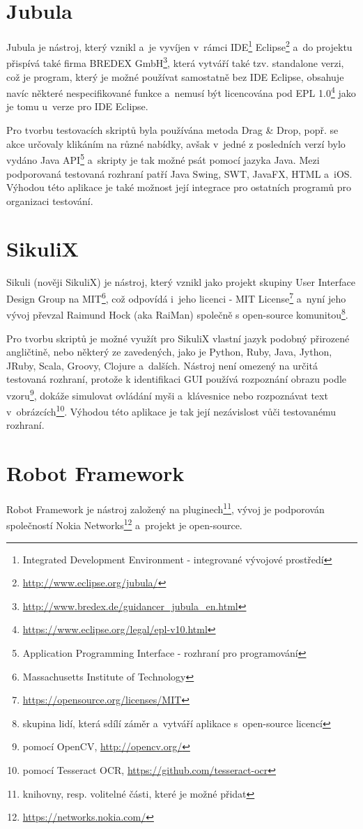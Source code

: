\documentclass{bakalarka}
\begin{document}
	\section{Jubula}
	Jubula je nástroj, který vznikl a~je vyvíjen v~rámci IDE\footnote{Integrated Development Environment - integrované vývojové prostředí} Eclipse\footnote{\url{http://www.eclipse.org/jubula/}} a~do projektu přispívá také firma BREDEX GmbH\footnote{\url{http://www.bredex.de/guidancer_jubula_en.html}}, která vytváří také tzv. standalone verzi, což je program, který je možné používat samostatně bez IDE Eclipse, obsahuje navíc některé nespecifikované funkce a~nemusí být licencována pod EPL 1.0\footnote{\url{https://www.eclipse.org/legal/epl-v10.html}} jako je tomu u~verze pro IDE Eclipse.
	
	Pro tvorbu testovacích skriptů byla používána metoda Drag \& Drop, popř. se akce určovaly klikáním na různé nabídky, avšak v~jedné z posledních verzí bylo vydáno Java API\footnote{Application Programming Interface - rozhraní pro programování} a~skripty je tak možné psát pomocí jazyka Java. Mezi podporovaná testovaná rozhraní patří Java Swing, SWT, JavaFX, HTML a~iOS. Výhodou této aplikace je také možnost její integrace pro ostatních programů pro organizaci testování.
	
	\section{SikuliX}
	Sikuli (nověji SikuliX) je nástroj, který vznikl jako projekt skupiny User Interface Design Group na MIT\footnote{Massachusetts Institute of Technology}, což odpovídá i~jeho licenci - MIT License\footnote{\url{https://opensource.org/licenses/MIT}} a~nyní jeho vývoj převzal Raimund Hock (aka RaiMan) společně s open-source komunitou\footnote{skupina lidí, která sdílí záměr a~vytváří aplikace s~open-source licencí}.
	
	Pro tvorbu skriptů je možné využít pro SikuliX vlastní jazyk podobný přirozené angličtině, nebo některý ze zavedených, jako je Python, Ruby, Java, Jython, JRuby, Scala, Groovy, Clojure a~dalších. Nástroj není omezený na určitá testovaná rozhraní, protože k identifikaci GUI používá rozpoznání obrazu podle vzoru\footnote{pomocí OpenCV, \url{http://opencv.org/}}, dokáže simulovat ovládání myši a~klávesnice nebo rozpoznávat text v~obrázcích\footnote{pomocí Tesseract OCR, \url{https://github.com/tesseract-ocr}}. Výhodou této aplikace je tak její nezávislost vůči testovanému rozhraní.
	
	\section{Robot Framework}
	Robot Framework je nástroj založený na pluginech\footnote{knihovny, resp. volitelné části, které je možné přidat}, vývoj je podporován společností Nokia Networks\footnote{\url{https://networks.nokia.com/}} a~projekt je open-source.
	
\end{document}
